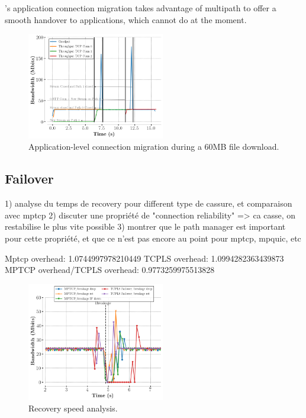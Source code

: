 \tcpls's application connection migration takes advantage of multipath to offer
a smooth handover to applications, which \tcpls cannot do at the moment.

\begin{figure}[!t]
  \centering
  \includegraphics[width=6cm]{figures/migration.png}
  \caption{Application-level connection migration during a 60MB file download.}
  \label{fig:conn_migration}
\end{figure}

\subsection{Failover}

1) analyse du temps de recovery pour different type de cassure, et comparaison avec mptcp
2) discuter une propriété de "connection reliability" => ca casse, on restabilise le plus vite possible
3) montrer que le path manager est important pour cette propriété, et que ce n'est pas encore au point pour mptcp, mpquic, etc

Mptcp overhead: 1.0744997978210449
TCPLS overhead: 1.0994282363439873
MPTCP overhead/TCPLS overhead:              0.9773259975513828


\begin{figure}[!t]
  \begin{center}
    \includegraphics[width=6cm]{figures/breakage_analysis.png}
  \end{center}
  \caption{Recovery speed analysis.}
\end{figure}


